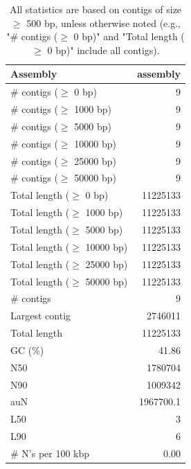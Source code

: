 \documentclass[12pt,a4paper]{article}
\begin{document}
\begin{table}[ht]
\begin{center}
\caption{All statistics are based on contigs of size $\geq$ 500 bp, unless otherwise noted (e.g., "\# contigs ($\geq$ 0 bp)" and "Total length ($\geq$ 0 bp)" include all contigs).}
\begin{tabular}{|l*{1}{|r}|}
\hline
Assembly & assembly \\ \hline
\# contigs ($\geq$ 0 bp) & 9 \\ \hline
\# contigs ($\geq$ 1000 bp) & 9 \\ \hline
\# contigs ($\geq$ 5000 bp) & 9 \\ \hline
\# contigs ($\geq$ 10000 bp) & 9 \\ \hline
\# contigs ($\geq$ 25000 bp) & 9 \\ \hline
\# contigs ($\geq$ 50000 bp) & 9 \\ \hline
Total length ($\geq$ 0 bp) & 11225133 \\ \hline
Total length ($\geq$ 1000 bp) & 11225133 \\ \hline
Total length ($\geq$ 5000 bp) & 11225133 \\ \hline
Total length ($\geq$ 10000 bp) & 11225133 \\ \hline
Total length ($\geq$ 25000 bp) & 11225133 \\ \hline
Total length ($\geq$ 50000 bp) & 11225133 \\ \hline
\# contigs & 9 \\ \hline
Largest contig & 2746011 \\ \hline
Total length & 11225133 \\ \hline
GC (\%) & 41.86 \\ \hline
N50 & 1780704 \\ \hline
N90 & 1009342 \\ \hline
auN & 1967700.1 \\ \hline
L50 & 3 \\ \hline
L90 & 6 \\ \hline
\# N's per 100 kbp & 0.00 \\ \hline
\end{tabular}
\end{center}
\end{table}
\end{document}
